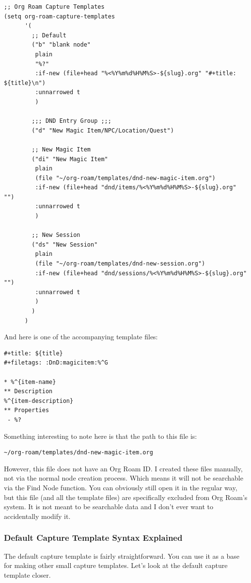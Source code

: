 \documentclass[11pt]{article}
\begin{document}
\begin{verbatim}
;; Org Roam Capture Templates
(setq org-roam-capture-templates
      '(
        ;; Default
        ("b" "blank node"
         plain
         "%?"
         :if-new (file+head "%<%Y%m%d%H%M%S>-${slug}.org" "#+title: ${title}\n")
         :unnarrowed t
         )

        ;;; DND Entry Group ;;;
        ("d" "New Magic Item/NPC/Location/Quest")

        ;; New Magic Item
        ("di" "New Magic Item"
         plain
         (file "~/org-roam/templates/dnd-new-magic-item.org")
         :if-new (file+head "dnd/items/%<%Y%m%d%H%M%S>-${slug}.org" "")
         :unnarrowed t
         )

        ;; New Session
        ("ds" "New Session"
         plain
         (file "~/org-roam/templates/dnd-new-session.org")
         :if-new (file+head "dnd/sessions/%<%Y%m%d%H%M%S>-${slug}.org" "")
         :unnarrowed t
         )
        )
      )
\end{verbatim}

And here is one of the accompanying template files:

\begin{verbatim}
#+title: ${title}
#+filetags: :DnD:magicitem:%^G

* %^{item-name}
** Description
%^{item-description}
** Properties
 - %?
\end{verbatim}

Something interesting to note here is that the path to this file is:

\begin{verbatim}
~/org-roam/templates/dnd-new-magic-item.org
\end{verbatim}

However, this file does not have an Org Roam ID. I created these files manually, not via the normal node creation process. Which means it will not be searchable via the Find Node function. You can obviously still open it in the regular way, but this file (and all the template files) are specifically excluded from Org Roam's system. It is not meant to be searchable data and I don't ever want to accidentally modify it.
\subsubsection*{Default Capture Template Syntax Explained}
\label{sec:org28b9519}
The default capture template is fairly straightforward. You can use it as a base for making other small capture templates. Let's look at the default capture template closer.
\end{document}
